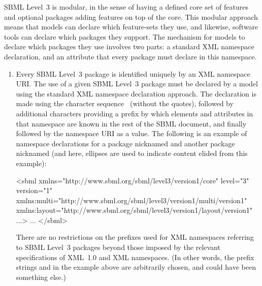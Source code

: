 SBML Level~3 is modular, in the sense of having a defined core set
of features and optional packages adding features on top of the
core.  This modular approach means that models can declare which
feature-sets they use, and likewise, software tools can declare
which packages they support.  The mechanism for models to declare
which packages they use involves two parts: a standard XML
namespace declaration, and an attribute that every package must
declare in this namespace.
\begin{enumerate}

\item Every SBML Level~3 package is identified uniquely by an XML
  namespace URI.  The use of a given SBML Level~3 package must be
  declared by a model using the standard XML namespace declaration
  approach.  The declaration is made using the character sequence
  \ (without the quotes), followed by additional
  characters providing a prefix by which elements and attributes
  in that namespace are known in the rest of the SBML document,
  and finally followed by the namespace URI as a value.  The
  following is an example of namespace declarations for a package
  nicknamed  and another package nicknamed 
  (and here, ellipses are used to indicate content elided from
  this example):
  \begin{example}
<sbml xmlns="http://www.sbml.org/sbml/level3/version1/core" level="3" version="1"
      xmlns:multi="http://www.sbml.org/sbml/level3/version1/multi/version1"
      xmlns:layout="http://www.sbml.org/sbml/level3/version1/layout/version1" ...>
  ...  
</sbml>\end{example}
  There are no restrictions on the prefixes used for XML namespaces
  referring to SBML Level~3 packages beyond those imposed by the
  relevant specifications of XML~1.0 and XML namespaces.  (In other
  words, the prefix strings  and  in the
  example above are arbitrarily chosen, and could have been
  something else.)


\end{enumerate}
